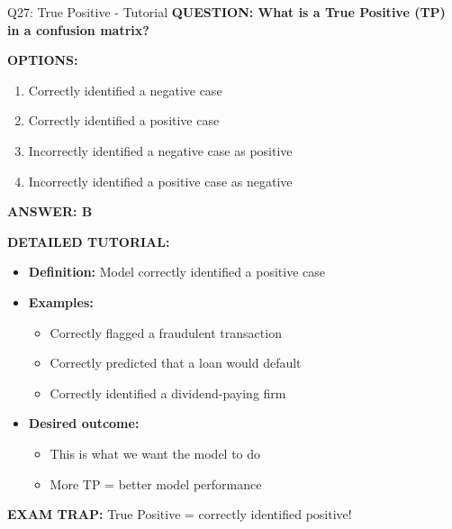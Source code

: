 \documentclass[8pt]{beamer}
\begin{document}
	\begin{frame}{Q27: True Positive - Tutorial}
		\fontsize{6.5}{7.5}\selectfont
		\textbf{QUESTION: What is a True Positive (TP) in a confusion matrix?}
		
		\vspace{0.1cm}
		\textbf{OPTIONS:}
		\begin{enumerate}
			\item Correctly identified a negative case
			\item Correctly identified a positive case
			\item Incorrectly identified a negative case as positive
			\item Incorrectly identified a positive case as negative
		\end{enumerate}
		
		\vspace{0.1cm}
		\textcolor{myblue}{\textbf{ANSWER: B}}
		
		\vspace{0.1cm}
		\textbf{DETAILED TUTORIAL:}
		\begin{itemize}
			\item \textbf{Definition:} Model correctly identified a positive case
			\item \textbf{Examples:}
			\begin{itemize}
				\item Correctly flagged a fraudulent transaction
				\item Correctly predicted that a loan would default
				\item Correctly identified a dividend-paying firm
			\end{itemize}
			\item \textbf{Desired outcome:}
			\begin{itemize}
				\item This is what we want the model to do
				\item More TP = better model performance
			\end{itemize}
		\end{itemize}
		
		\textcolor{myred}{\textbf{EXAM TRAP:}} True Positive = \textcolor{myblue}{correctly identified positive}!
	\end{frame}
	
\end{document}
